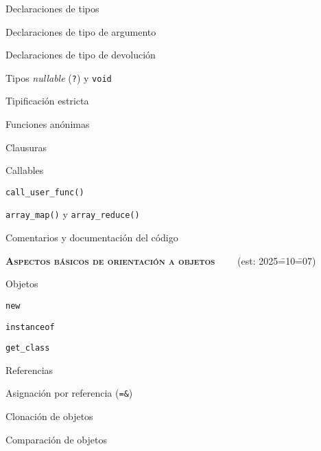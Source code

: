 \begin{longenum}
\begin{longenum}
\begin{longenum}
            \item Declaraciones de tipos
            \begin{longenum}
                \item Declaraciones de tipo de argumento
                \item Declaraciones de tipo de devolución
                \item Tipos \textit{nullable} (\texttt{?}) y \texttt{void}
                \item Tipificación estricta
            \end{longenum}
            \item Funciones anónimas
            \begin{longenum}
                \item Clausuras
            \end{longenum}
            \item Callables
            \begin{longenum}
                \item \texttt{call\_user\_func()}
                \item \texttt{array\_map()} y \texttt{array\_reduce()}
            \end{longenum}
        \end{longenum}
        \item Comentarios y documentación del código
    \end{longenum}
    \item \textbf{\textsc{Aspectos básicos de orientación a objetos}} \ \ \ \ (est: 2025\==10\==07)
    \begin{longenum}
        \item Objetos
        \begin{longenum}
            \item \texttt{new}
            \item \texttt{instanceof}
            \item \texttt{get\_class}
        \end{longenum}
        \item Referencias
        \begin{longenum}
            \item Asignación por referencia (\texttt{=\&})
        \end{longenum}
        \item Clonación de objetos
        \item Comparación de objetos

\end{longenum}
\end{longenum}
